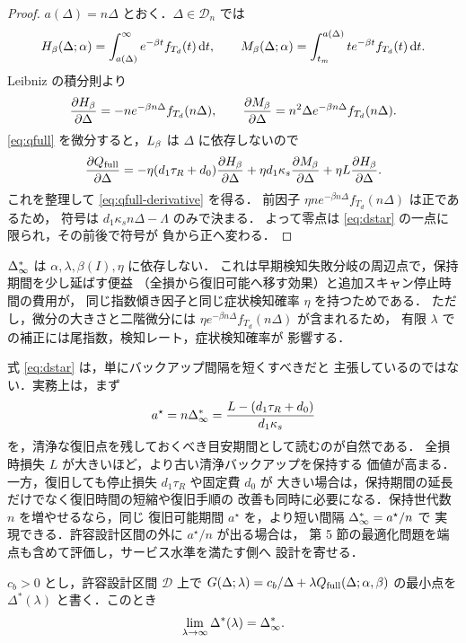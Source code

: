 \begin{proof}
$a(\Delta)=n\Delta$ とおく．$\Delta\in\mathcal{D}_n$ では
\[
  H_\beta(\Delta;\alpha)
  =\int_{a(\Delta)}^\infty e^{-\beta t}f_{T_d}(t)\,\mathrm{d} t,\qquad
  M_\beta(\Delta;\alpha)
  =\int_{t_m}^{a(\Delta)} t e^{-\beta t}f_{T_d}(t)\,\mathrm{d} t .
\]
Leibniz の積分則より
\[
  \frac{\partial H_\beta}{\partial\Delta}
  =-n e^{-\beta n\Delta}f_{T_d}(n\Delta),\qquad
  \frac{\partial M_\beta}{\partial\Delta}
  =n^2\Delta e^{-\beta n\Delta}f_{T_d}(n\Delta).
\]
\eqref{eq:qfull} を微分すると，$L_\beta$ は $\Delta$ に依存しないので
\[
  \frac{\partial Q_{\mathrm{full}}}{\partial\Delta}
  =-\eta(d_1\tau_R+d_0)\frac{\partial H_\beta}{\partial\Delta}
  +\eta d_1\kappa_s\frac{\partial M_\beta}{\partial\Delta}
  +\eta L\frac{\partial H_\beta}{\partial\Delta}.
\]
これを整理して \eqref{eq:qfull-derivative} を得る．
前因子 $\eta n e^{-\beta n\Delta}f_{T_d}(n\Delta)$ は正であるため，
符号は $d_1\kappa_s n\Delta-\Lambda$ のみで決まる．
よって零点は \eqref{eq:dstar} の一点に限られ，その前後で符号が
負から正へ変わる．
\end{proof}

\begin{remark}
$\Delta_\infty^\ast$ は $\alpha,\lambda,\beta(I),\eta$ に依存しない．
これは早期検知失敗分岐の周辺点で，保持期間を少し延ばす便益
（全損から復旧可能へ移す効果）と追加スキャン停止時間の費用が，
同じ指数傾き因子と同じ症状検知確率 $\eta$ を持つためである．
ただし，微分の大きさと二階微分には
$\eta e^{-\beta n\Delta}f_{T_d}(n\Delta)$ が含まれるため，
有限 $\lambda$ での補正には尾指数，検知レート，症状検知確率が
影響する．
\end{remark}

\begin{remark}[設計式の実務的解釈]
式 \eqref{eq:dstar} は，単にバックアップ間隔を短くすべきだと
主張しているのではない．実務上は，まず
\[
  a^\star=n\Delta_\infty^\ast=\frac{L-(d_1\tau_R+d_0)}{d_1\kappa_s}
\]
を，清浄な復旧点を残しておくべき目安期間として読むのが自然である．
全損時損失 $L$ が大きいほど，より古い清浄バックアップを保持する
価値が高まる．一方，復旧しても停止損失 $d_1\tau_R$ や固定費 $d_0$ が
大きい場合は，保持期間の延長だけでなく復旧時間の短縮や復旧手順の
改善も同時に必要になる．保持世代数 $n$ を増やせるなら，同じ
復旧可能期間 $a^\star$ を，より短い間隔 $\Delta_\infty^\ast=a^\star/n$ で
実現できる．許容設計区間の外に $a^\star/n$ が出る場合は，
第 5 節の最適化問題を端点も含めて評価し，サービス水準を満たす側へ
設計を寄せる．
\end{remark}

\begin{theorem}[頻度漸近独立性]
$c_b>0$ とし，許容設計区間 $\mathcal{D}$ 上で
$G(\Delta;\lambda)=c_b/\Delta+\lambda Q_{\mathrm{full}}(\Delta;\alpha,\beta)$
の最小点を $\Delta^\ast(\lambda)$ と書く．このとき
\[
  \lim_{\lambda\to\infty}\Delta^\ast(\lambda)=\Delta_\infty^\ast .
\]
\end{theorem}

